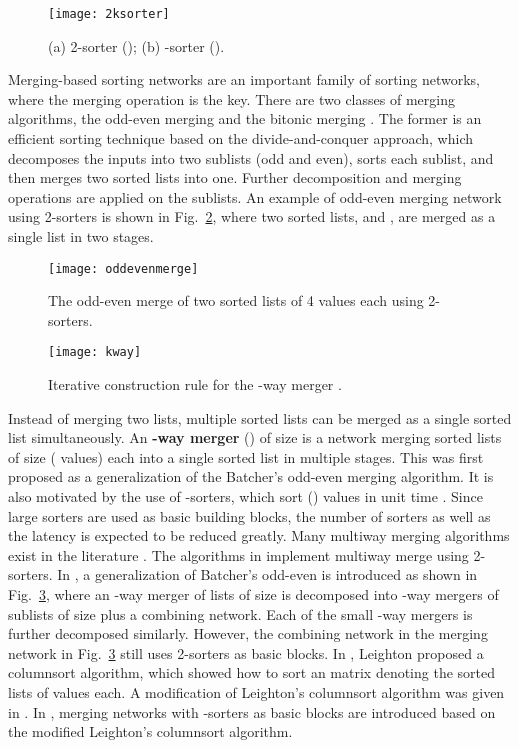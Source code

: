 \documentclass[10pt,journal,cspaper,compsoc]{IEEEtran}
\begin{document}
\begin{figure}[!t]
\centering
\texttt{[image: 2ksorter]}
\caption{(a) 2-sorter (); (b) -sorter ().}
\label{fig:2ksorter}
\end{figure}

Merging-based sorting networks are an important family of sorting networks, where the merging operation is the key. There are two classes of merging algorithms, the odd-even merging \cite{Bat68sorting} and the bitonic merging \cite{batcher1990bitonic}. The former is an efficient sorting technique based on the divide-and-conquer approach, which decomposes the inputs into two sublists (odd and even), sorts each sublist, and then merges two sorted lists into one. Further decomposition and merging operations are applied on the sublists.
An example of odd-even merging network using 2-sorters is shown in Fig.~\ref{fig:oddeven}, where two sorted lists,  and , are merged as a single list  in two stages.
\begin{figure}[!t]
\centering
\texttt{[image: oddevenmerge]}
\caption{The odd-even merge of two sorted lists of 4 values each using 2-sorters.}
\label{fig:oddeven}
\end{figure}

\begin{figure}[!t]
\centering
\texttt{[image: kway]}
\caption{Iterative construction rule for the -way merger \cite{Lee95multiway}.}
\label{fig:kway}
\end{figure}


Instead of merging two lists, multiple sorted lists can be merged as a single sorted list simultaneously.
An \textbf{-way merger} () of size  is a network merging  sorted lists of size  ( values) each into a single sorted list in multiple stages.
This was first proposed as a generalization of the Batcher's odd-even merging algorithm. It is also motivated by the use of -sorters, which sort  () values in unit time \cite{parker1989constructing,beigel1990sorting}. Since large sorters are used as basic building blocks, the number of sorters as well as the latency is expected to be reduced greatly.
Many multiway merging algorithms exist in the literature \cite{drysdale1975improved, van1974economical, Lee95multiway, nakatani1989e1, lee1994sorting, leighton1984tight, parker1989constructing, liszka1993generalized, gao1997sloping, zhao1998efficient}. The algorithms in \cite{drysdale1975improved, van1974economical} implement multiway merge using 2-sorters. In \cite{Lee95multiway}, a generalization of Batcher's odd-even is introduced as shown in Fig.~\ref{fig:kway}, where an -way merger of  lists of size  is decomposed into  -way mergers of  sublists of size  plus a combining network. Each of the small -way mergers is further decomposed similarly. However, the combining network in the merging network in Fig.~\ref{fig:kway} still uses 2-sorters as basic blocks.
In \cite{leighton1984tight}, Leighton proposed a columnsort algorithm, which showed how to sort an  matrix denoting the  sorted lists of  values each. A modification of Leighton's columnsort algorithm was given in \cite{parker1989constructing}.
In \cite{gao1997sloping,zhao1998efficient}, merging networks with -sorters as basic blocks are introduced based on the modified Leighton's columnsort algorithm.
\end{document}
